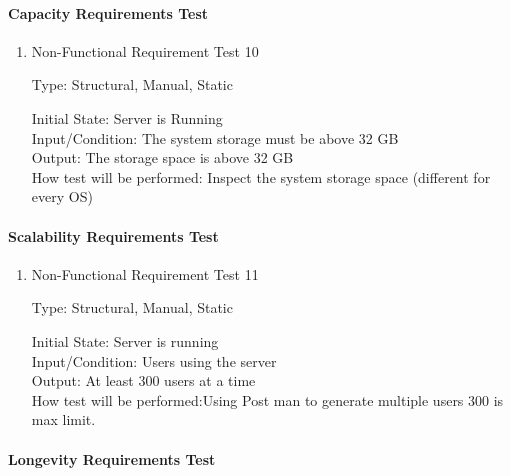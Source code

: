 \documentclass[12pt, titlepage]{article}
\begin{document}
\paragraph{Capacity Requirements Test}

\begin{enumerate}

\item{Non-Functional Requirement Test 10\\}

Type: Structural, Manual, Static
					
Initial State: Server is Running \\
					
Input/Condition: The system storage must be above 32 GB  \\
					
Output: The storage space is above 32 GB \\
					
How test will be performed: Inspect the system storage space (different for every OS) \\
\end{enumerate}

\paragraph{Scalability Requirements Test}

\begin{enumerate}

\item{Non-Functional Requirement Test 11\\}

Type: Structural, Manual, Static 
					
Initial State: Server is running \\
					
Input/Condition: Users using the server \\
					
Output: At least 300 users at a time \\
					
How test will be performed:Using Post man to generate multiple users 300 is max limit. \\

\end{enumerate}


\paragraph{Longevity Requirements Test}
\end{document}
